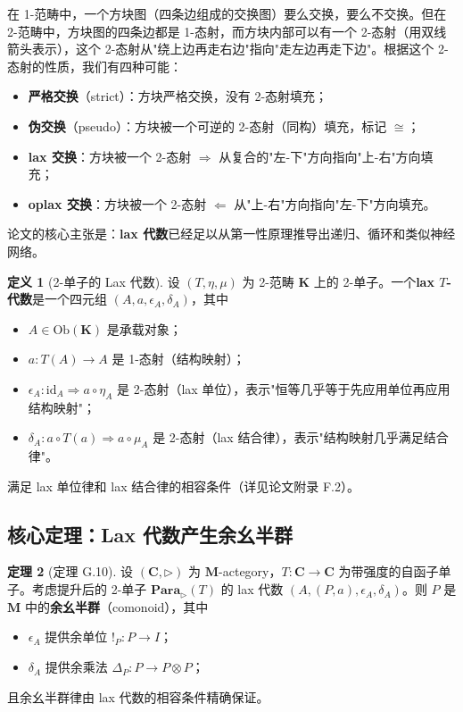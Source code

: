 \documentclass[12pt,a4paper]{ctexart}
\theoremstyle{definition}
\newtheorem{definition}{定义}[section]
\newtheorem{theorem}[definition]{定理}
\newcommand{\cat}[1]{\mathbf{#1}}
\newcommand{\Para}{\cat{Para}}
\newcommand{\id}{\mathrm{id}}
\newcommand{\ob}[1]{\mathrm{Ob}(#1)}
\begin{document}
在 1-范畴中，一个方块图（四条边组成的交换图）要么交换，要么不交换。但在 2-范畴中，方块图的四条边都是 1-态射，而方块内部可以有一个 2-态射（用双线箭头表示），这个 2-态射从"绕上边再走右边"指向"走左边再走下边"。根据这个 2-态射的性质，我们有四种可能：
\begin{itemize}[nosep]
    \item \textbf{严格交换}（strict）：方块严格交换，没有 2-态射填充；
    \item \textbf{伪交换}（pseudo）：方块被一个可逆的 2-态射（同构）填充，标记 $\cong$；
    \item \textbf{lax 交换}：方块被一个 2-态射 $\Rightarrow$ 从复合的"左-下"方向指向"上-右"方向填充；
    \item \textbf{oplax 交换}：方块被一个 2-态射 $\Leftarrow$ 从"上-右"方向指向"左-下"方向填充。
\end{itemize}

论文的核心主张是：\textbf{lax 代数}已经足以从第一性原理推导出递归、循环和类似神经网络。

\begin{definition}[2-单子的 Lax 代数]\label{def:lax-alg}
设 $(T,\eta,\mu)$ 为 2-范畴 $\cat K$ 上的 2-单子。一个\textbf{lax $T$-代数}是一个四元组 $(A,a,\epsilon_A,\delta_A)$，其中
\begin{itemize}[nosep]
    \item $A\in\ob{\cat K}$ 是承载对象；
    \item $a:T(A)\to A$ 是 1-态射（结构映射）；
    \item $\epsilon_A:\id_A\Rightarrow a\circ\eta_A$ 是 2-态射（lax 单位），表示"恒等几乎等于先应用单位再应用结构映射"；
    \item $\delta_A:a\circ T(a)\Rightarrow a\circ\mu_A$ 是 2-态射（lax 结合律），表示"结构映射几乎满足结合律"。
\end{itemize}
满足 lax 单位律和 lax 结合律的相容条件（详见论文附录 F.2）。
\end{definition}

\subsection{核心定理：Lax 代数产生余幺半群}

\begin{theorem}[定理 G.10]\label{thm:comonoid}
设 $(\cat C,\rhd)$ 为 $\cat M$-actegory，$T:\cat C\to\cat C$ 为带强度的自函子单子。考虑提升后的 2-单子 $\Para_\rhd(T)$ 的 lax 代数 $(A,(P,a),\epsilon_A,\delta_A)$。则 $P$ 是 $\cat M$ 中的\textbf{余幺半群}（comonoid），其中
\begin{itemize}[nosep]
    \item $\epsilon_A$ 提供余单位 $!_P:P\to I$；
    \item $\delta_A$ 提供余乘法 $\Delta_P:P\to P\otimes P$；
\end{itemize}
且余幺半群律由 lax 代数的相容条件精确保证。
\end{theorem}
\end{document}
